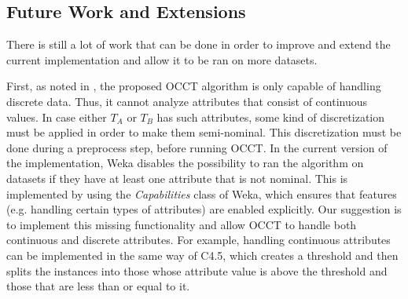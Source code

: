 \documentclass[a4paper,12pt]{article}
\begin{document}
\begin{spacing}{1.5}
\section{Future Work and Extensions}

There is still a lot of work that can be done in order to improve and extend the current implementation and allow it to be ran on more datasets.

First, as noted in \cite{dror2011thesis}, the proposed OCCT algorithm is only capable of handling discrete data. Thus, it cannot analyze attributes that consist of continuous values. In case either $T_A$ or $T_B$ has such attributes, some kind of discretization must be applied in order to make them semi-nominal. This discretization must be done during a preprocess step, before running OCCT. In the current version of the implementation, Weka disables the possibility to ran the algorithm on datasets if they have at least one attribute that is not nominal. This is implemented by using the {\em Capabilities} class of Weka, which ensures that features (e.g. handling certain types of attributes) are enabled explicitly. Our suggestion is to implement this missing functionality and allow OCCT to handle both continuous and discrete attributes. For example, handling continuous attributes can be implemented in the same way of C4.5, which creates a threshold and then splits the instances into those whose attribute value is above the threshold and those that are less than or equal to it.


\end{spacing}
\end{document}
